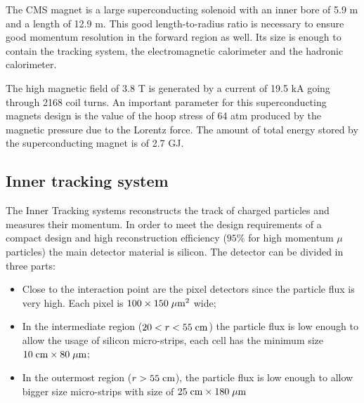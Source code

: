 The CMS magnet is a large superconducting solenoid with an inner bore of 5.9 m and a length of 12.9 m.  This good length-to-radius ratio is necessary to ensure good momentum resolution in the forward region as well. Its size is enough to contain the tracking system, the electromagnetic calorimeter and the hadronic calorimeter. 

The high magnetic field of $3.8$ T is generated by a current of 19.5 kA going through 2168 coil turns. An important parameter for this superconducting magnets design is the value of the hoop stress of 64 atm produced by the magnetic pressure due to the Lorentz force. The amount of total energy stored by the superconducting magnet is of 2.7 GJ.

		

\subsection{Inner tracking system}

The Inner Tracking systems reconstructs the track of charged particles and measures their momentum. In order to meet the design requirements of a compact design and high reconstruction efficiency ($95\%$ for high momentum $\mu$ particles) the main detector material is silicon.
The detector can be divided in three parts:
\begin{itemize}
	\item Close to the interaction point are the pixel detectors since the particle flux is very high. Each pixel is $100\times150\;\mu\text{m}^{2}$ wide;
	\item In the intermediate region ($20 < r < 55\;\text{cm}$) the particle flux is low enough to allow the usage of silicon micro-strips, each cell has the minimum size $10\;\text{cm} \times 80\;\mu\text{m}$;
	\item In the outermost region ($r > 55\;\text{cm}$), the particle flux is low enough to allow bigger size micro-strips with size of $25\;\text{cm} \times 180 \;\mu\text{m}$ 
\end{itemize}

